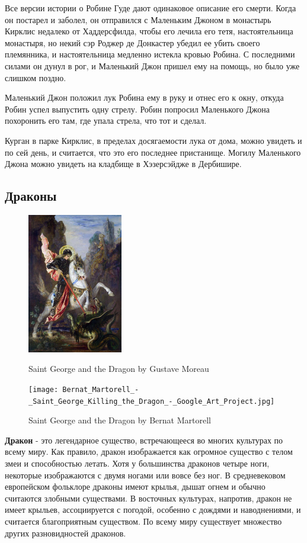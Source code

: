 Все версии истории о Робине Гуде дают одинаковое описание его
смерти. Когда он постарел и заболел, он отправился с Маленьким
Джоном в монастырь Кирклис недалеко от Хаддерсфилда, чтобы его
лечила его тетя, настоятельница монастыря, но некий сэр Роджер
де Донкастер убедил ее убить своего племянника, и настоятельница
медленно истекла кровью Робина. С последними силами он дунул в
рог, и Маленький Джон пришел ему на помощь, но было уже слишком поздно.

Маленький Джон положил лук Робина ему в руку и отнес его к окну,
откуда Робин успел выпустить одну стрелу. Робин попросил Маленького
Джона похоронить его там, где упала стрела, что тот и сделал.

Курган в парке Кирклис, в пределах досягаемости лука от дома, можно
увидеть и по сей день, и считается, что это его последнее пристанище.
Могилу Маленького Джона можно увидеть на кладбище в Хэзерсэйдже в
Дербишире.

\newpage



\newpage

\subsection*{Драконы}

\begin{figure}
    \centering
    \includegraphics[width=0.37\textwidth]{Saint-George-and-the-Dragon.jpg}
    \caption{Saint George and the Dragon by Gustave Moreau}
    \texttt{[image: Bernat\_Martorell\_-\_Saint\_George\_Killing\_the\_Dragon\_-\_Google\_Art\_Project.jpg]}
    \caption{Saint George and the Dragon by Bernat Martorell}
\end{figure}

\textbf{Дракон} - это легендарное существо, встречающееся во многих
культурах по всему миру. Как правило, дракон изображается как
огромное существо с телом змеи и способностью летать. Хотя у
большинства драконов четыре ноги, некоторые изображаются с двумя
ногами или вовсе без ног. В средневековом европейском фольклоре
драконы имеют крылья, дышат огнем и обычно считаются злобными
существами. В восточных культурах, напротив, дракон не имеет
крыльев, ассоциируется с погодой, особенно с дождями и наводнениями,
и считается благоприятным существом. По всему миру существует
множество других разновидностей драконов.

